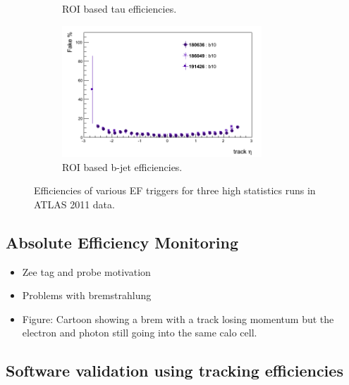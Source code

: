 \begin{figure}[htbp]
\begin{subfigure}{.5\linewidth}
		\caption{ROI based tau efficiencies.}
		\label{fig:trig_2011_EF_eta_e}
	\end{subfigure}
	\begin{subfigure}{.5\linewidth}	
		\centering
		\includegraphics[width=75mm]{f/b10_IDTrkNoCut_eta_EF_fake}
		\caption{ROI based b-jet efficiencies.}
		\label{fig:trig_2011_EF_eta_g}
	\end{subfigure}
	\caption{Efficiencies of various EF triggers for three high statistics runs in ATLAS 2011 data.}
	\label{fig:trig_2011_EF_eta}
\end{figure}

\clearpage

\subsection{Absolute Efficiency Monitoring}

\begin{itemize}
\item Zee tag and probe motivation
\item Problems with bremstrahlung
\item Figure: Cartoon showing a brem with a track losing momentum but the electron and photon still going into the same calo cell.
\end{itemize}

\subsection{Software validation using tracking efficiencies}







